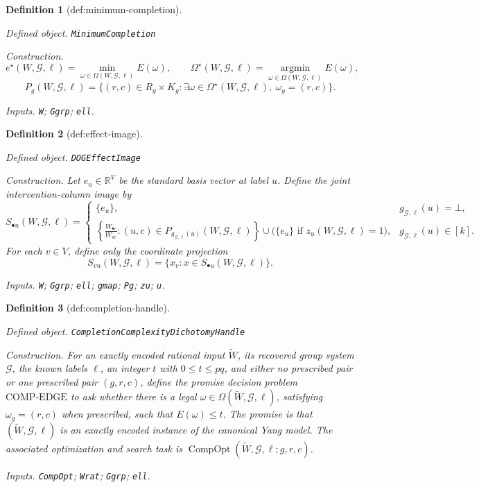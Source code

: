 \documentclass{article}
\newtheorem{definition}{Definition}
\begin{document}
\begin{definition}[def:minimum-completion]\label{def:minimum-completion}
\par\smallskip\noindent\emph{Defined object.} \texttt{MinimumCompletion}
\par\smallskip\noindent\emph{Construction.} \[e^{\star}(W,\mathcal G,\ell)=\min_{\omega\in\Omega(W,\mathcal G,\ell)}E(\omega),\qquad \Omega^{\star}(W,\mathcal G,\ell)=\operatorname*{argmin}_{\omega\in\Omega(W,\mathcal G,\ell)}E(\omega),\]\[P_g(W,\mathcal G,\ell)=\{(r,c)\in R_g\times K_g:\exists\omega\in\Omega^{\star}(W,\mathcal G,\ell),\ \omega_g=(r,c)\}.\]
\par\smallskip\noindent\emph{Inputs.} \texttt{W}; \texttt{Ggrp}; \texttt{ell}.
\end{definition}

\begin{definition}[def:effect-image]\label{def:effect-image}
\par\smallskip\noindent\emph{Defined object.} \texttt{DOGEffectImage}
\par\smallskip\noindent\emph{Construction.} Let \(e_u\in\mathbb R^V\) be the standard basis vector at label \(u\).  Define the joint intervention-column image by
\[
S_{\bullet u}(W,\mathcal G,\ell)=
\begin{cases}
\{e_u\},&g_{\mathcal G,\ell}(u)=\bot,\\
\displaystyle
\left\{\frac{W_{\bullet c}}{W_{uc}}:(u,c)\in
P_{g_{\mathcal G,\ell}(u)}(W,\mathcal G,\ell)\right\}
\cup
\bigl(\{e_u\}\text{ if }z_u(W,\mathcal G,\ell)=1\bigr),
&g_{\mathcal G,\ell}(u)\in[k].
\end{cases}
\]
For each \(v\in V\), define only the coordinate projection
\[
S_{vu}(W,\mathcal G,\ell)
=\{x_v:x\in S_{\bullet u}(W,\mathcal G,\ell)\}.
\]
\par\smallskip\noindent\emph{Inputs.} \texttt{W}; \texttt{Ggrp}; \texttt{ell}; \texttt{gmap}; \texttt{Pg}; \texttt{zu}; \texttt{u}.
\end{definition}

\begin{definition}[def:completion-handle]\label{def:completion-handle}
\par\smallskip\noindent\emph{Defined object.} \texttt{CompletionComplexityDichotomyHandle}
\par\smallskip\noindent\emph{Construction.} For an exactly encoded rational input \(\widetilde W\), its recovered group system \(\mathcal G\), the known labels \(\ell\), an integer \(t\) with \(0\le t\le pq\), and either no prescribed pair or one prescribed pair \((g,r,c)\), define the promise decision problem \(\mathrm{COMP\text{-}EDGE}\) to ask whether there is a legal \(\omega\in\Omega(\widetilde W,\mathcal G,\ell)\), satisfying \(\omega_g=(r,c)\) when prescribed, such that \(E(\omega)\le t\). The promise is that \((\widetilde W,\mathcal G,\ell)\) is an exactly encoded instance of the canonical Yang model. The associated optimization and search task is \(\operatorname{CompOpt}(\widetilde W,\mathcal G,\ell;g,r,c)\).
\par\smallskip\noindent\emph{Inputs.} \texttt{CompOpt}; \texttt{Wrat}; \texttt{Ggrp}; \texttt{ell}.
\end{definition}
\end{document}
